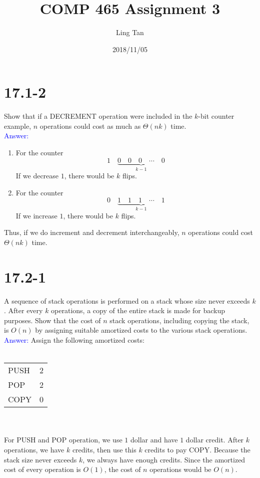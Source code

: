 \documentclass[a4paper]{article}
\title{COMP 465 Assignment 3}
\author{Ling Tan}
\date{2018/11/05}
\begin{document}
\maketitle

\section{17.1-2} Show that if a DECREMENT operation were included in the $k$-bit counter example, $n$ operations could cost as much as $\Theta(nk)$ time.\\
\textcolor{blue}{Answer:}
    \begin{enumerate}
        \item For the counter
            \begin{equation*}
                1\quad\underbrace{0\quad0\quad0\quad\cdots\quad0}_{k-1}
            \end{equation*}
            If we decrease $1$, there would be $k$ flips.
        \item For the counter
            \begin{equation*}
                0\quad\underbrace{1\quad1\quad1\quad\cdots\quad1}_{k-1}
            \end{equation*}
            If we increase $1$, there would be $k$ flips.
    \end{enumerate}
    Thus, if we do increment and decrement interchangeably, $n$ operations could cost $\Theta(nk)$ time.
    
\section{17.2-1} A sequence of stack operations is performed on a stack whose size never exceeds $k$. After every $k$ operations, a copy of the entire stack is made for backup purposes. Show that the cost of $n$ stack operations, including copying the stack, is $O(n)$ by assigning suitable amortized costs to the various stack operations.\\
\textcolor{blue}{Answer:}
Assign the following amortized costs:\\\\
    \begin{tabular}{l|c}
        PUSH &  2\\
        POP & 2\\
        COPY & 0
    \end{tabular}
\\\\
For PUSH and POP operation, we use $1$ dollar and have $1$ dollar credit. After $k$ operations, we have $k$ credits, then use this $k$ credits to pay COPY. Because the stack size never exceeds $k$, we always have enough credits. Since the amortized cost of every operation is $O(1)$, the cost of $n$ operations would be $O(n)$.
\end{document}
